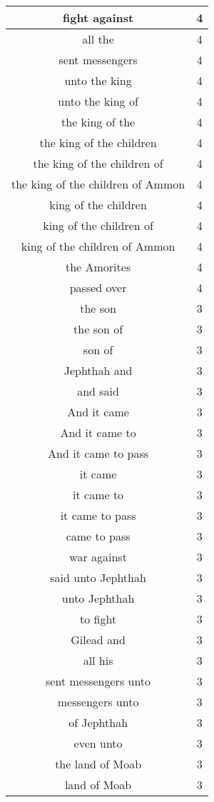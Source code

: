 \begin{center}
\begin{longtable}{|c|c|}
fight against & 4\\ \hline 
all the & 4\\ \hline 
sent messengers & 4\\ \hline 
unto the king & 4\\ \hline 
unto the king of & 4\\ \hline 
the king of the & 4\\ \hline 
the king of the children & 4\\ \hline 
the king of the children of & 4\\ \hline 
the king of the children of Ammon & 4\\ \hline 
king of the children & 4\\ \hline 
king of the children of & 4\\ \hline 
king of the children of Ammon & 4\\ \hline 
the Amorites & 4\\ \hline 
passed over & 4\\ \hline 
the son & 3\\ \hline 
the son of & 3\\ \hline 
son of & 3\\ \hline 
Jephthah and & 3\\ \hline 
and said & 3\\ \hline 
And it came & 3\\ \hline 
And it came to & 3\\ \hline 
And it came to pass & 3\\ \hline 
it came & 3\\ \hline 
it came to & 3\\ \hline 
it came to pass & 3\\ \hline 
came to pass & 3\\ \hline 
war against & 3\\ \hline 
said unto Jephthah & 3\\ \hline 
unto Jephthah & 3\\ \hline 
to fight & 3\\ \hline 
Gilead and & 3\\ \hline 
all his & 3\\ \hline 
sent messengers unto & 3\\ \hline 
messengers unto & 3\\ \hline 
of Jephthah & 3\\ \hline 
even unto & 3\\ \hline 
the land of Moab & 3\\ \hline 
land of Moab & 3\\ \hline 

\end{longtable}
\end{center}
